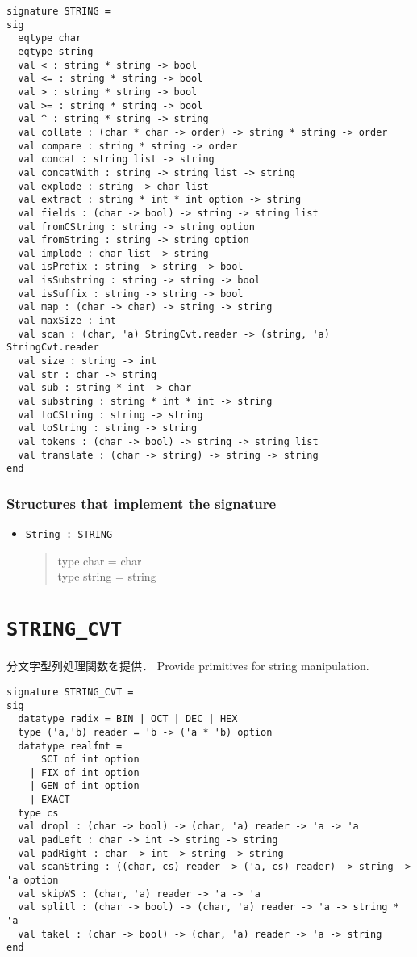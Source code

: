\documentclass{jbook}
\newcommand{\txt}[2]{#2}
\newcommand{\code}[1]{\mbox{\large\tt #1}}
\newenvironment{program}{\begin{quote}\begin{tt}}%
                        {\end{tt}\end{quote}}
\newcommand{\signature}[2]{
\section{{\tt #1}}\label{section:reference:#2}
}
\newcommand{\Structure}{\subsubsection*{\txt{シグネチャを実装するストラクチャ}{Structures that implement the signature}}}
\begin{document}
\begin{verbatim}
signature STRING =
sig
  eqtype char
  eqtype string
  val < : string * string -> bool
  val <= : string * string -> bool
  val > : string * string -> bool
  val >= : string * string -> bool
  val ^ : string * string -> string
  val collate : (char * char -> order) -> string * string -> order
  val compare : string * string -> order
  val concat : string list -> string
  val concatWith : string -> string list -> string
  val explode : string -> char list
  val extract : string * int * int option -> string
  val fields : (char -> bool) -> string -> string list
  val fromCString : string -> string option
  val fromString : string -> string option
  val implode : char list -> string
  val isPrefix : string -> string -> bool
  val isSubstring : string -> string -> bool
  val isSuffix : string -> string -> bool
  val map : (char -> char) -> string -> string
  val maxSize : int
  val scan : (char, 'a) StringCvt.reader -> (string, 'a) StringCvt.reader
  val size : string -> int
  val str : char -> string
  val sub : string * int -> char
  val substring : string * int * int -> string
  val toCString : string -> string
  val toString : string -> string
  val tokens : (char -> bool) -> string -> string list
  val translate : (char -> string) -> string -> string
end
\end{verbatim}

\Structure
\begin{itemize}
\item \code{String : STRING}
\begin{program}
  type char = char
\\
  type string = string
\end{program}
\end{itemize}

\signature{STRING\_CVT}{STRINGCVT}
\ifjp%
	分文字型列処理関数を提供．
\else%
	Provide primitives for string manipulation.
\fi%

\begin{verbatim}
signature STRING_CVT =
sig
  datatype radix = BIN | OCT | DEC | HEX
  type ('a,'b) reader = 'b -> ('a * 'b) option
  datatype realfmt =
      SCI of int option
    | FIX of int option
    | GEN of int option
    | EXACT
  type cs
  val dropl : (char -> bool) -> (char, 'a) reader -> 'a -> 'a
  val padLeft : char -> int -> string -> string
  val padRight : char -> int -> string -> string
  val scanString : ((char, cs) reader -> ('a, cs) reader) -> string -> 'a option
  val skipWS : (char, 'a) reader -> 'a -> 'a
  val splitl : (char -> bool) -> (char, 'a) reader -> 'a -> string * 'a
  val takel : (char -> bool) -> (char, 'a) reader -> 'a -> string
end
\end{verbatim}
\end{document}
